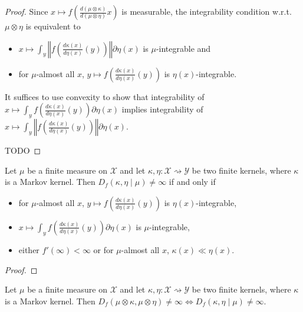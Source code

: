 \begin{proof}
Since $x \mapsto f \left(\frac{d(\mu \otimes \kappa)}{d(\mu \otimes \eta)} x \right)$ is measurable, the integrability condition w.r.t. $\mu \otimes \eta$ is equivalent to
\begin{itemize}
    \item $x \mapsto \int_y \left\Vert f \left( \frac{d\kappa(x)}{d\eta(x)}(y) \right) \right\Vert \partial \eta(x)$ is $\mu$-integrable and
    \item for $\mu$-almost all $x$, $y \mapsto f \left( \frac{d\kappa(x)}{d\eta(x)}(y) \right)$ is $\eta(x)$-integrable. 
  \end{itemize}
It suffices to use convexity to show that integrability of $x \mapsto \int_y f \left( \frac{d\kappa(x)}{d\eta(x)}(y) \right) \partial \eta(x)$ implies integrability of $x \mapsto \int_y \left\Vert f \left( \frac{d\kappa(x)}{d\eta(x)}(y) \right) \right\Vert \partial \eta(x)$.

TODO
\end{proof}

\begin{lemma}
  \label{lem:condFDiv_ne_top_iff}
  \leanok
  Let $\mu$ be a finite measure on $\mathcal X$ and let $\kappa, \eta : \mathcal X \rightsquigarrow \mathcal Y$ be two finite kernels, where $\kappa$ is a Markov kernel.
  Then $D_f(\kappa, \eta \mid \mu) \ne \infty$ if and only if
  \begin{itemize}
    \item for $\mu$-almost all $x$, $y \mapsto f \left( \frac{d\kappa(x)}{d\eta(x)}(y) \right)$ is $\eta(x)$-integrable,
    \item $x \mapsto \int_y f \left( \frac{d\kappa(x)}{d\eta(x)}(y) \right) \partial \eta(x)$ is $\mu$-integrable,
    \item either $f'(\infty) < \infty$ or for $\mu$-almost all $x$, $\kappa(x) \ll \eta(x)$.
  \end{itemize}
\end{lemma}

\begin{proof} \leanok
{}
\end{proof}

\begin{lemma}
  \label{lem:fDiv_compProd_ne_top_iff}
  \leanok
  Let $\mu$ be a finite measure on $\mathcal X$ and let $\kappa, \eta : \mathcal X \rightsquigarrow \mathcal Y$ be two finite kernels, where $\kappa$ is a Markov kernel.
  Then $D_f(\mu \otimes \kappa, \mu \otimes \eta) \ne \infty \iff D_f(\kappa, \eta \mid \mu) \ne \infty$.
\end{lemma}

